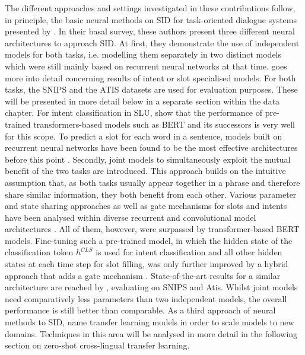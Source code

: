 \documentclass[11pt,a4paper,twoside,openright]{scrbook}
\begin{document}
The different approaches and settings investigated in these contributions follow, in principle, the basic neural methods on SID for task-oriented dialogue systems presented by \citet{louvan-magnini-2020-recent}. In their basal survey, these authors present three different neural architectures to approach SID. At first, they demonstrate the use of independent models for both tasks, i.e. modelling them separately in two distinct models which were still mainly based on recurrent neural networks at that time. \citet{kwon-etal-2023-sidlr} goes more into detail concerning results of intent or slot specialised models. For both tasks, the SNIPS \citep{coucke2018snips} and the ATIS \citep{hemphill-etal-1990-atis, upandhyay_atis_zeroshot} datasets are used for evaluation purposes. These will be presented in more detail below in a separate section within the data chapter. For intent classification in SLU, \citet{zhang-etal-2022-pre-trained} show that the performance of pre-trained transformers-based \citep{vaswani_attention} models such as BERT \citep{devlin-etal-2019-bert} and its successors is very well for this scope. To predict a slot for each word in a sentence, models built on recurrent neural networks have been found to be the most effective architectures before this point \citep{upandhyay_atis_zeroshot, kwon-etal-2023-sidlr}.
Secondly, joint models to simultaneously exploit the mutual benefit of the two tasks are introduced. This approach builds on the intuitive assumption that, as both tasks usually appear together in a phrase and therefore share similar information, they both benefit from each other. Various parameter and state sharing approaches as well as gate mechanisms for slots and intents have been analysed within diverse recurrent and convolutional model architectures \citep{louvan-magnini-2020-recent}. All of them, however, were surpassed by transformer-based BERT models. Fine-tuning such a pre-trained model, in which the hidden state of the classification token $h^{CLS}$ is used for intent classification and all other hidden states at each time step for slot filling, was only further improved by a hybrid approach that adds a gate mechanism \citep{zahng_joint_learning_BERT}. State-of-the-art results for a similar architecture are reached by \citet{chen2019bertjointintentclassification}, evaluating on SNIPS and Atis. Whilst joint models need comparatively less parameters than two independent models, the overall performance is still better than comparable. As a third approach of neural methods to SID, \citet{louvan-magnini-2020-recent} name transfer learning models in order to scale models to new domains. Techniques in this area will be analysed in more detail in the following section on zero-shot cross-lingual transfer learning.
\end{document}
